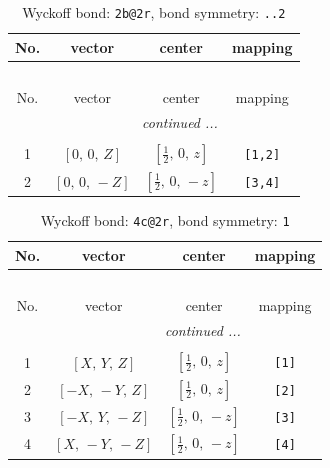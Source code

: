 \documentclass[fleqn,8pt]{jsarticle}
\begin{document}
\renewcommand{\arraystretch}{1.2}
\begin{longtable}{cccc}
\caption{Wyckoff bond: {\tt 2b@2r}, bond symmetry: {\tt ..2}}
 \\
 \hline \hline
No. & vector & center & mapping \\ \hline \endfirsthead

\multicolumn{3}{l}{\tablename\ \thetable{}} \\
 \hline \hline
No. & vector & center & mapping \\ \hline \endhead

 \hline \hline
\multicolumn{3}{r}{\footnotesize\it continued ...} \\ \endfoot

 \hline \hline
\multicolumn{3}{r}{} \\ \endlastfoot

1 & $\left[ 0,\, 0,\, Z \right]$ & $\left[ \frac{1}{2},\, 0,\, z \right]$ & {\tt [1,2]} \\ \hline
2 & $\left[ 0,\, 0,\, - Z \right]$ & $\left[ \frac{1}{2},\, 0,\, - z \right]$ & {\tt [3,4]} \\
\end{longtable}
\renewcommand{\arraystretch}{1.2}
\begin{longtable}{cccc}
\caption{Wyckoff bond: {\tt 4c@2r}, bond symmetry: {\tt 1}}
 \\
 \hline \hline
No. & vector & center & mapping \\ \hline \endfirsthead

\multicolumn{3}{l}{\tablename\ \thetable{}} \\
 \hline \hline
No. & vector & center & mapping \\ \hline \endhead

 \hline \hline
\multicolumn{3}{r}{\footnotesize\it continued ...} \\ \endfoot

 \hline \hline
\multicolumn{3}{r}{} \\ \endlastfoot

1 & $\left[ X,\, Y,\, Z \right]$ & $\left[ \frac{1}{2},\, 0,\, z \right]$ & {\tt [1]} \\ \hline
2 & $\left[ - X,\, - Y,\, Z \right]$ & $\left[ \frac{1}{2},\, 0,\, z \right]$ & {\tt [2]} \\ \hline
3 & $\left[ - X,\, Y,\, - Z \right]$ & $\left[ \frac{1}{2},\, 0,\, - z \right]$ & {\tt [3]} \\ \hline
4 & $\left[ X,\, - Y,\, - Z \right]$ & $\left[ \frac{1}{2},\, 0,\, - z \right]$ & {\tt [4]} \\
\end{longtable}
\end{document}
